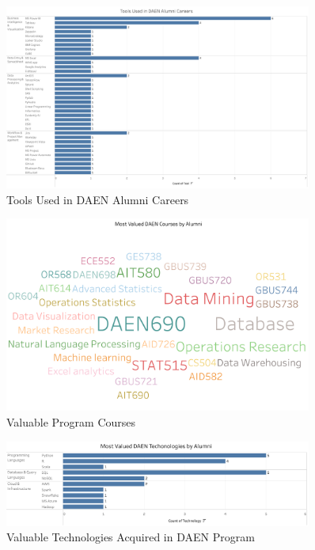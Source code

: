 \documentclass[12pt,a4paper]{article}
\begin{document}
\begin{figure}[H]
    \centering
    \includegraphics[width=0.9\textwidth]{visualizations/career-tools.png}
    \caption{Tools Used in DAEN Alumni Careers}
    \label{fig:career-tools}
\end{figure}

\begin{figure}[H]
    \centering
    \includegraphics[width=0.9\textwidth]{visualizations/daen-courses.png}
    \caption{Valuable Program Courses}
    \label{fig:daen-courses}
\end{figure}

\begin{figure}[H]
    \centering
    \includegraphics[width=0.9\textwidth]{visualizations/daen-technologies.png}
    \caption{Valuable Technologies Acquired in DAEN Program}
    \label{fig:daen-technologies}
\end{figure}
\end{document}
